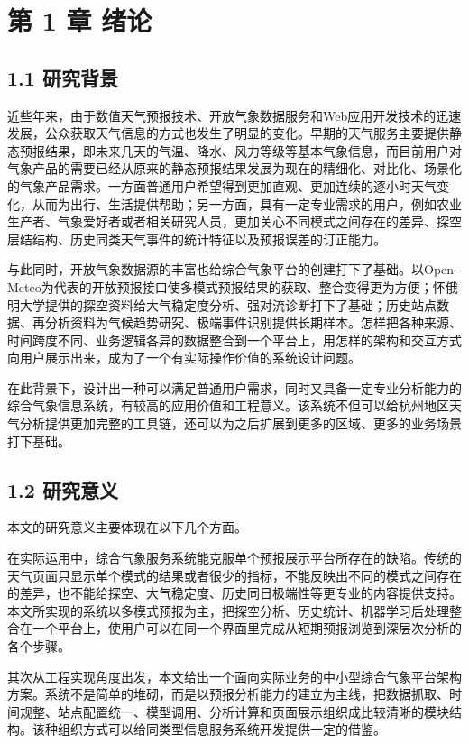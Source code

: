 \section{第 1 章 绪论}

\subsection{1.1 研究背景}

近些年来，由于数值天气预报技术、开放气象数据服务和Web应用开发技术的迅速发展，公众获取天气信息的方式也发生了明显的变化。早期的天气服务主要提供静态预报结果，即未来几天的气温、降水、风力等级等基本气象信息，而目前用户对气象产品的需要已经从原来的静态预报结果发展为现在的精细化、对比化、场景化的气象产品需求。一方面普通用户希望得到更加直观、更加连续的逐小时天气变化，从而为出行、生活提供帮助；另一方面，具有一定专业需求的用户，例如农业生产者、气象爱好者或者相关研究人员，更加关心不同模式之间存在的差异、探空层结结构、历史同类天气事件的统计特征以及预报误差的订正能力。

与此同时，开放气象数据源的丰富也给综合气象平台的创建打下了基础。以Open-Meteo为代表的开放预报接口使多模式预报结果的获取、整合变得更为方便；怀俄明大学提供的探空资料给大气稳定度分析、强对流诊断打下了基础；历史站点数据、再分析资料为气候趋势研究、极端事件识别提供长期样本。怎样把各种来源、时间跨度不同、业务逻辑各异的数据整合到一个平台上，用怎样的架构和交互方式向用户展示出来，成为了一个有实际操作价值的系统设计问题。

在此背景下，设计出一种可以满足普通用户需求，同时又具备一定专业分析能力的综合气象信息系统，有较高的应用价值和工程意义。该系统不但可以给杭州地区天气分析提供更加完整的工具链，还可以为之后扩展到更多的区域、更多的业务场景打下基础。

\subsection{1.2 研究意义}

本文的研究意义主要体现在以下几个方面。

在实际运用中，综合气象服务系统能克服单个预报展示平台所存在的缺陷。传统的天气页面只显示单个模式的结果或者很少的指标，不能反映出不同的模式之间存在的差异，也不能给探空、大气稳定度、历史同日极端性等更专业的内容提供支持。本文所实现的系统以多模式预报为主，把探空分析、历史统计、机器学习后处理整合在一个平台上，使用户可以在同一个界面里完成从短期预报浏览到深层次分析的各个步骤。

其次从工程实现角度出发，本文给出一个面向实际业务的中小型综合气象平台架构方案。系统不是简单的堆砌，而是以预报分析能力的建立为主线，把数据抓取、时间规整、站点配置统一、模型调用、分析计算和页面展示组织成比较清晰的模块结构。该种组织方式可以给同类型信息服务系统开发提供一定的借鉴。


